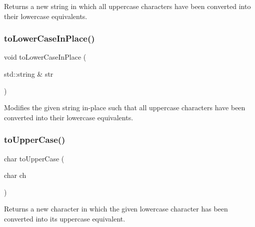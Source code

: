 Returns a new string in which all uppercase characters have been converted into their lowercase equivalents. 

\mbox{\label{namespacesgl_1_1priv_1_1strlib_a35dff265e3225cca9aacba6254d4e083}} 
\subsubsection{\texorpdfstring{to\+Lower\+Case\+In\+Place()}{toLowerCaseInPlace()}}
{\footnotesize\ttfamily void to\+Lower\+Case\+In\+Place (\begin{DoxyParamCaption}\item[{std\+::string \&}]{str }\end{DoxyParamCaption})}



Modifies the given string in-\/place such that all uppercase characters have been converted into their lowercase equivalents. 

\mbox{\label{namespacesgl_1_1priv_1_1strlib_a13fc513819fb1d0c1aad0dce15fdcecc}} 
\subsubsection{\texorpdfstring{to\+Upper\+Case()}{toUpperCase()}\hspace{0.1cm}{\footnotesize\ttfamily [1/2]}}
{\footnotesize\ttfamily char to\+Upper\+Case (\begin{DoxyParamCaption}\item[{char}]{ch }\end{DoxyParamCaption})}



Returns a new character in which the given lowercase character has been converted into its uppercase equivalent. 

\mbox{\label{namespacesgl_1_1priv_1_1strlib_aa504de245b08376b4309366fa40a5815}} 
